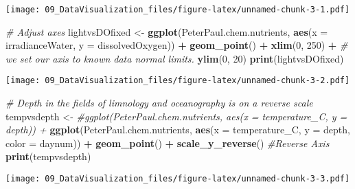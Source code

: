 \documentclass[]{article}
\newenvironment{Shaded}{\begin{snugshade}}{\end{snugshade}}
\newcommand{\KeywordTok}[1]{\textcolor[rgb]{0.13,0.29,0.53}{\textbf{#1}}}
\newcommand{\DataTypeTok}[1]{\textcolor[rgb]{0.13,0.29,0.53}{#1}}
\newcommand{\DecValTok}[1]{\textcolor[rgb]{0.00,0.00,0.81}{#1}}
\newcommand{\StringTok}[1]{\textcolor[rgb]{0.31,0.60,0.02}{#1}}
\newcommand{\CommentTok}[1]{\textcolor[rgb]{0.56,0.35,0.01}{\textit{#1}}}
\newcommand{\OperatorTok}[1]{\textcolor[rgb]{0.81,0.36,0.00}{\textbf{#1}}}
\newcommand{\NormalTok}[1]{#1}
\begin{document}
\texttt{[image: 09\_DataVisualization\_files/figure-latex/unnamed-chunk-3-1.pdf]}

\begin{Shaded}
\begin{Highlighting}[]
\CommentTok{# Adjust axes}
\NormalTok{lightvsDOfixed <-}\StringTok{ }
\StringTok{  }\KeywordTok{ggplot}\NormalTok{(PeterPaul.chem.nutrients, }\KeywordTok{aes}\NormalTok{(}\DataTypeTok{x =}\NormalTok{ irradianceWater, }\DataTypeTok{y =}\NormalTok{ dissolvedOxygen)) }\OperatorTok{+}
\StringTok{  }\KeywordTok{geom_point}\NormalTok{() }\OperatorTok{+}
\StringTok{  }\KeywordTok{xlim}\NormalTok{(}\DecValTok{0}\NormalTok{, }\DecValTok{250}\NormalTok{) }\OperatorTok{+}\StringTok{ }\CommentTok{# we set our axis to known data normal limits.}
\StringTok{  }\KeywordTok{ylim}\NormalTok{(}\DecValTok{0}\NormalTok{, }\DecValTok{20}\NormalTok{)}
\KeywordTok{print}\NormalTok{(lightvsDOfixed)}
\end{Highlighting}
\end{Shaded}

\texttt{[image: 09\_DataVisualization\_files/figure-latex/unnamed-chunk-3-2.pdf]}

\begin{Shaded}
\begin{Highlighting}[]
\CommentTok{# Depth in the fields of limnology and oceanography is on a reverse scale}
\NormalTok{tempvsdepth <-}\StringTok{ }
\StringTok{  }\CommentTok{#ggplot(PeterPaul.chem.nutrients, aes(x = temperature_C, y = depth)) +}
\StringTok{  }\KeywordTok{ggplot}\NormalTok{(PeterPaul.chem.nutrients, }\KeywordTok{aes}\NormalTok{(}\DataTypeTok{x =}\NormalTok{ temperature_C, }\DataTypeTok{y =}\NormalTok{ depth, }\DataTypeTok{color =}\NormalTok{ daynum)) }\OperatorTok{+}
\StringTok{  }\KeywordTok{geom_point}\NormalTok{() }\OperatorTok{+}
\StringTok{  }\KeywordTok{scale_y_reverse}\NormalTok{()    }\CommentTok{#Reverse Axis}
\KeywordTok{print}\NormalTok{(tempvsdepth)}
\end{Highlighting}
\end{Shaded}

\texttt{[image: 09\_DataVisualization\_files/figure-latex/unnamed-chunk-3-3.pdf]}
\end{document}
